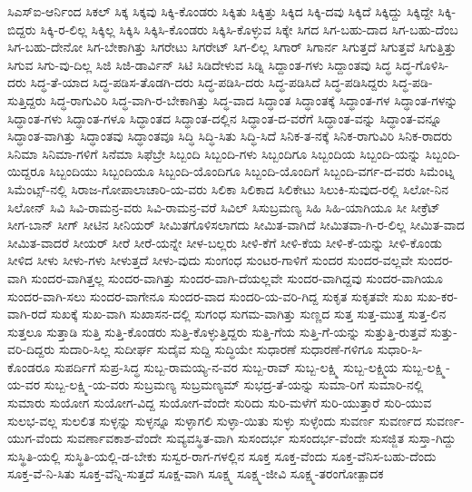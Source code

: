 {ಸಿಎಸ್ಐ-ಆರ್ನಿಂದ
ಸಿಕಲ್
ಸಿಕ್ಕ
ಸಿಕ್ಕವು
ಸಿಕ್ಕಿ-ಕೊಂಡರು
ಸಿಕ್ಕಿತು
ಸಿಕ್ಕಿತ್ತು
ಸಿಕ್ಕಿದ
ಸಿಕ್ಕಿ-ದವು
ಸಿಕ್ಕಿದೆ
ಸಿಕ್ಕಿದ್ದು
ಸಿಕ್ಕಿದ್ದೇ
ಸಿಕ್ಕಿ-ಬಿದ್ದರು
ಸಿಕ್ಕಿ-ರ-ಲಿಲ್ಲ
ಸಿಕ್ಕಿಲ್ಲ
ಸಿಕ್ಕಿಸಿ
ಸಿಕ್ಕಿಸಿ-ಕೊಂಡರು
ಸಿಕ್ಕಿಸಿ-ಕೊಳ್ಳುವ
ಸಿಕ್ಕೇ
ಸಿಗದ
ಸಿಗ-ಬಹು-ದಾದ
ಸಿಗ-ಬಹು-ದೆಂಬ
ಸಿಗ-ಬಹು-ದೇನೋ
ಸಿಗ-ಬೇಕಾಗಿತ್ತು
ಸಿಗರೇಟು
ಸಿಗರೇಟ್
ಸಿಗ-ಲಿಲ್ಲ
ಸಿಗಾರ್
ಸಿಗಾರ್ನ
ಸಿಗುತ್ತದೆ
ಸಿಗುತ್ತವೆ
ಸಿಗುತ್ತಿತ್ತು
ಸಿಗುವ
ಸಿಗು-ವು-ದಿಲ್ಲ
ಸಿಜಿ
ಸಿಜಿ-ಡಾರ್ವಿನ್
ಸಿಟಿ
ಸಿಡಿದೇಳುವ
ಸಿಡ್ನಿ
ಸಿದ್ದಾಂತ-ಗಳು
ಸಿದ್ದಾಂತವು
ಸಿದ್ಧ
ಸಿದ್ಧ-ಗೊಳಿಸಿ-ದರು
ಸಿದ್ಧ-ತೆ-ಯಾದ
ಸಿದ್ಧ-ಪಡಿಸ-ತೊಡಗಿ-ದರು
ಸಿದ್ಧ-ಪಡಿಸಿ-ದರು
ಸಿದ್ಧ-ಪಡಿಸಿದೆ
ಸಿದ್ಧ-ಪಡಿಸಿದ್ದರು
ಸಿದ್ಧ-ಪಡಿ-ಸುತ್ತಿದ್ದರು
ಸಿದ್ಧ-ರಾಗುವಿರಿ
ಸಿದ್ಧ-ವಾಗಿ-ರ-ಬೇಕಾಗಿತ್ತು
ಸಿದ್ಧ-ವಾದ
ಸಿದ್ಧಾಂತ
ಸಿದ್ಧಾಂತಕ್ಕೆ
ಸಿದ್ಧಾಂತ-ಗಳ
ಸಿದ್ಧಾಂತ-ಗಳನ್ನು
ಸಿದ್ಧಾಂತ-ಗಳು
ಸಿದ್ಧಾಂತ-ಗಳೂ
ಸಿದ್ಧಾಂತದ
ಸಿದ್ಧಾಂತ-ದಲ್ಲಿನ
ಸಿದ್ಧಾಂತ-ದ-ವರೆಗೆ
ಸಿದ್ಧಾಂತ-ವನ್ನು
ಸಿದ್ಧಾಂತ-ವನ್ನೂ
ಸಿದ್ಧಾಂತ-ವಾಗಿತ್ತು
ಸಿದ್ಧಾಂತವು
ಸಿದ್ಧಾಂತವೂ
ಸಿದ್ಧಿ
ಸಿದ್ಧಿ-ಸಿತು
ಸಿದ್ಧಿ-ಸಿದೆ
ಸಿನಿಕ-ತ-ನಕ್ಕೆ
ಸಿನಿಕ-ರಾಗುವಿರಿ
ಸಿನಿಕ-ರಾದರು
ಸಿನಿಮಾ
ಸಿನಿಮಾ-ಗಳಿಗೆ
ಸಿನೆಮಾ
ಸಿಫೆಬ್ರೇ
ಸಿಬ್ಬಂದಿ
ಸಿಬ್ಬಂದಿ-ಗಳು
ಸಿಬ್ಬಂದಿಗೂ
ಸಿಬ್ಬಂದಿಯ
ಸಿಬ್ಬಂದಿ-ಯನ್ನು
ಸಿಬ್ಬಂದಿ-ಯಿದ್ದರೂ
ಸಿಬ್ಬಂದಿಯು
ಸಿಬ್ಬಂದಿಯೂ
ಸಿಬ್ಬಂದಿ-ಯೊಂದಿಗೂ
ಸಿಬ್ಬಂದಿ-ಯೊಂದಿಗೆ
ಸಿಬ್ಬಂದಿ-ವರ್ಗ-ದ-ವರು
ಸಿಮೆಂಟ್ನ
ಸಿಮೆಂಟ್ಸ್-ನಲ್ಲಿ
ಸಿರಾಜ-ಗೋಪಾಲಾಚಾರಿ-ಯ-ವರು
ಸಿಲಿಕಾ
ಸಿಲಿಕಾದ
ಸಿಲಿಕೇಟು
ಸಿಲುಕಿ-ಸುವುದ-ರಲ್ಲಿ
ಸಿಲೋ-ನಿನ
ಸಿಲೋನ್
ಸಿವಿ
ಸಿವಿ-ರಾಮನ್ರ-ವರು
ಸಿವಿ-ರಾಮನ್ರ-ವರೆ
ಸಿವಿಲ್
ಸಿಸುಬ್ರಮಣ್ಯ
ಸಿಹಿ
ಸಿಹಿ-ಯಾಗಿಯೂ
ಸೀ
ಸೀಕ್ರೆಟ್
ಸೀಗ-ಬಾನ್
ಸೀಗ್
ಸೀಟಿನ
ಸೀನಿಯರ್
ಸೀಮಿತಗೊಳಿಸಲಾಗದು
ಸೀಮಿತ-ವಾಗಿದೆ
ಸೀಮಿತವಾ-ಗಿ-ರ-ಲಿಲ್ಲ
ಸೀಮಿತ-ವಾದ
ಸೀಮಿತ-ವಾದರೆ
ಸೀಯರ್
ಸೀರೆ
ಸೀರೆ-ಯನ್ನೇ
ಸೀಳ-ಬಲ್ಲರು
ಸೀಳಿ-ಕೆಗೆ
ಸೀಳಿ-ಕೆಯ
ಸೀಳಿ-ಕೆ-ಯನ್ನು
ಸೀಳಿ-ಕೊಂಡು
ಸೀಳಿದ
ಸೀಳು
ಸೀಳು-ಗಳು
ಸೀಳುತ್ತದೆ
ಸೀಳು-ವುದು
ಸುಂಗಂಧ
ಸುಂಟರ-ಗಾಳಿಗೆ
ಸುಂದರ
ಸುಂದರ-ವಲ್ಲವೇ
ಸುಂದರ-ವಾಗಿ
ಸುಂದರ-ವಾಗಿತ್ತಲ್ಲ
ಸುಂದರ-ವಾಗಿತ್ತು
ಸುಂದರ-ವಾಗಿ-ದೆಯಲ್ಲವೇ
ಸುಂದರ-ವಾಗಿದ್ದವು
ಸುಂದರ-ವಾಗಿಯೂ
ಸುಂದರ-ವಾಗಿ-ಸಲು
ಸುಂದರ-ವಾಗೇನೂ
ಸುಂದರ-ವಾದ
ಸುಂದರಿ-ಯ-ವರಿ-ಗಿದ್ದ
ಸುಕೃತ
ಸುಕೃತವೇ
ಸುಖ
ಸುಖ-ಕರ-ವಾಗಿ-ರದೆ
ಸುಖಕ್ಕೆ
ಸುಖ-ವಾಗಿ
ಸುಖಾಸನ-ದಲ್ಲಿ
ಸುಗಂಧ
ಸುಗಮ-ವಾಗಿತ್ತು
ಸುಣ್ಣದ
ಸುತ್ತ
ಸುತ್ತ-ಮುತ್ತ
ಸುತ್ತ-ಲಿನ
ಸುತ್ತಲೂ
ಸುತ್ತಾಡಿ
ಸುತ್ತಿ
ಸುತ್ತಿ-ಕೊಂಡರು
ಸುತ್ತಿ-ಕೊಳ್ಳುತ್ತಿದ್ದರು
ಸುತ್ತಿ-ಗೆಯ
ಸುತ್ತಿ-ಗೆ-ಯನ್ನು
ಸುತ್ತುತ್ತಿ-ರುತ್ತವೆ
ಸುತ್ತು-ವರಿ-ದಿದ್ದರು
ಸುದಾರಿ-ಸಿಲ್ಲ
ಸುದೀರ್ಘ
ಸುದೈವ
ಸುದ್ದಿ
ಸುದ್ಧಿಯೇ
ಸುಧಾರಣೆ
ಸುಧಾರಣೆ-ಗಳಿಗೂ
ಸುಧಾರಿ-ಸಿ-ಕೊಂಡರೂ
ಸುಪರ್ದಿಗೆ
ಸುಪ್ರ-ಸಿದ್ಧ
ಸುಬ್ಬ-ರಾಮಯ್ಯ-ನ-ವರ
ಸುಬ್ಬ-ರಾವ್
ಸುಬ್ಬ-ಲಕ್ಷ್ಮಿ
ಸುಬ್ಬ-ಲಕ್ಷ್ಮಿಯ
ಸುಬ್ಬ-ಲಕ್ಷ್ಮಿ-ಯ-ವರ
ಸುಬ್ಬ-ಲಕ್ಷ್ಮಿ-ಯ-ವರು
ಸುಬ್ರಮಣ್ಯ
ಸುಬ್ರಮಣ್ಯಮ್
ಸುಭದ್ರ-ತೆ-ಯನ್ನು
ಸುಮಾ-ರಿಗೆ
ಸುಮಾರಿ-ನಲ್ಲಿ
ಸುಮಾರು
ಸುಯೋಗ
ಸುಯೋಗ-ವಿದ್ದ
ಸುಯೋಗ-ವೆಂದೇ
ಸುರಿದು
ಸುರಿ-ಮಳೆಗೆ
ಸುರಿ-ಯುತ್ತಾರೆ
ಸುರಿ-ಯುವ
ಸುಲಭ-ವಲ್ಲ
ಸುಲಲಿತ
ಸುಳ್ಳನ್ನು
ಸುಳ್ಳನ್ನೂ
ಸುಳ್ಳಾಗಲಿ
ಸುಳ್ಳಾ-ಯಿತು
ಸುಳ್ಳು
ಸುಳ್ಳೆಂದು
ಸುವರ್ಣ
ಸುವರ್ಣದ
ಸುವರ್ಣ-ಯುಗ-ವೆಂದು
ಸುವರ್ಣಾವಕಾಶ-ವೆಂದೇ
ಸುವ್ಯವಸ್ಥಿತ-ವಾಗಿ
ಸುಸಂದರ್ಭ
ಸುಸಂದರ್ಭ-ವೆಂದೇ
ಸುಸಜ್ಜಿತ
ಸುಸ್ತಾ-ಗಿದ್ದು
ಸುಸ್ಥಿತಿ-ಯಲ್ಲಿ
ಸುಸ್ಥಿತಿ-ಯಲ್ಲಿ-ಡ-ಬೇಕು
ಸುಸ್ವರ-ರಾಗ-ಗಳಲ್ಲಿನ
ಸೂಕ್ತ
ಸೂಕ್ತ-ವೆಂದು
ಸೂಕ್ತ-ವೆನಿಸ-ಬಹು-ದೆಂದು
ಸೂಕ್ತ-ವೆ-ನಿ-ಸಿತು
ಸೂಕ್ತ-ವೆನ್ನಿ-ಸುತ್ತದೆ
ಸೂಕ್ಷ-ವಾಗಿ
ಸೂಕ್ಷ್ಮ
ಸೂಕ್ಷ್ಮ-ಜೀವಿ
ಸೂಕ್ಷ್ಮ-ತರಂಗೋತ್ಪಾದಕ
}
